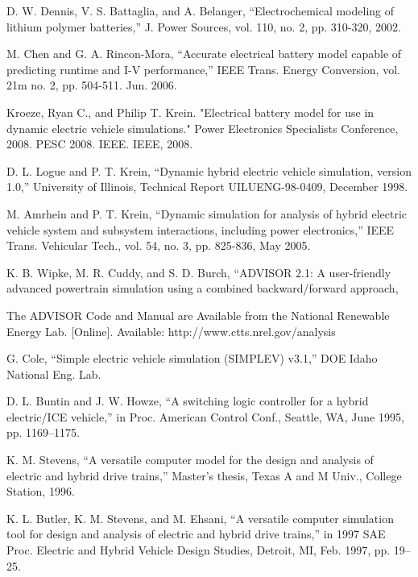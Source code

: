 D. W. Dennis, V. S. Battaglia, and A. Belanger, “Electrochemical
modeling of lithium polymer batteries,” J. Power Sources, vol. 110,
no. 2, pp. 310-320, 2002.

M. Chen and G. A. Rincon-Mora, “Accurate electrical battery model
capable of predicting runtime and I-V performance,” IEEE Trans.
Energy Conversion, vol. 21m no. 2, pp. 504-511. Jun. 2006.

Kroeze, Ryan C., and Philip T. Krein. "Electrical battery model for use in dynamic electric vehicle simulations." Power Electronics Specialists Conference, 2008. PESC 2008. IEEE. IEEE, 2008.


D. L. Logue and P. T. Krein, “Dynamic hybrid electric vehicle
simulation, version 1.0,” University of Illinois, Technical Report
UILUENG-98-0409, December 1998.

M. Amrhein and P. T. Krein, “Dynamic simulation for analysis of
hybrid electric vehicle system and subsystem interactions, including
power electronics,” IEEE Trans. Vehicular Tech., vol. 54, no. 3, pp.
825-836, May 2005.

K. B. Wipke, M. R. Cuddy, and S. D. Burch, “ADVISOR 2.1: A
user-friendly advanced powertrain simulation using a combined backward/forward
approach,

The ADVISOR Code and Manual are Available from the National Renewable
Energy Lab. [Online]. Available: http://www.ctts.nrel.gov/analysis

G. Cole, “Simple electric vehicle simulation (SIMPLEV) v3.1,” DOE
Idaho National Eng. Lab.

D. L. Buntin and J. W. Howze, “A switching logic controller for a
hybrid electric/ICE vehicle,” in Proc. American Control Conf., Seattle,
WA, June 1995, pp. 1169–1175.

K. M. Stevens, “A versatile computer model for the design and analysis
of electric and hybrid drive trains,” Master’s thesis, Texas A and M Univ.,
College Station, 1996.

K. L. Butler, K. M. Stevens, and M. Ehsani, “A versatile computer
simulation tool for design and analysis of electric and hybrid drive
trains,” in 1997 SAE Proc. Electric and Hybrid Vehicle Design Studies,
Detroit, MI, Feb. 1997, pp. 19–25.

